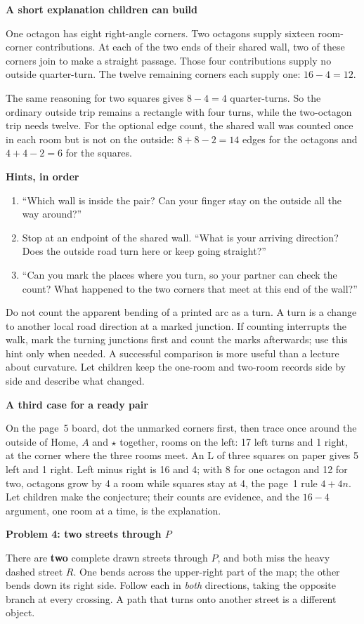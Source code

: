 \documentclass[11pt]{article}
\newcommand{\topic}[1]{\vspace{4pt}{\large\bfseries #1}\par}
\newcommand{\sub}[1]{{\bfseries #1}\par}
\begin{document}
\sub{A short explanation children can build}
One octagon has eight right-angle corners. Two octagons supply sixteen room-corner contributions. At each of the two ends of their shared wall, two of these corners join to make a straight passage. Those four contributions supply no outside quarter-turn. The twelve remaining corners each supply one: \(16-4=12\).

The same reasoning for two squares gives \(8-4=4\) quarter-turns. So the ordinary outside trip remains a rectangle with four turns, while the two-octagon trip needs twelve. For the optional edge count, the shared wall was counted once in each room but is not on the outside: \(8+8-2=14\) edges for the octagons and \(4+4-2=6\) for the squares.

\sub{Hints, in order}
\begin{enumerate}
\item ``Which wall is inside the pair? Can your finger stay on the outside all the way around?''
\item Stop at an endpoint of the shared wall. ``What is your arriving direction? Does the outside road turn here or keep going straight?''
\item ``Can you mark the places where you turn, so your partner can check the count? What happened to the two corners that meet at this end of the wall?''
\end{enumerate}
Do not count the apparent bending of a printed arc as a turn. A turn is a change to another local road direction at a marked junction. If counting interrupts the walk, mark the turning junctions first and count the marks afterwards; use this hint only when needed. A successful comparison is more useful than a lecture about curvature. Let children keep the one-room and two-room records side by side and describe what changed.

\sub{A third case for a ready pair}
On the page~5 board, dot the unmarked corners first, then trace once around the outside of Home, \(A\) and \(\star\) together, rooms on the left: 17 left turns and 1 right, at the corner where the three rooms meet. An L of three squares on paper gives 5 left and 1 right. Left minus right is 16 and 4; with 8 for one octagon and 12 for two, octagons grow by 4 a room while squares stay at 4, the page~1 rule \(4+4n\). Let children make the conjecture; their counts are evidence, and the \(16-4\) argument, one room at a time, is the explanation.
\newpage

\topic{Problems 4--6: whole roads, room routes and growth}
\sub{Problem 4: two streets through \(P\)}
There are \textbf{two} complete drawn streets through \(P\), and both miss the heavy dashed street \(R\). One bends across the upper-right part of the map; the other bends down its right side. Follow each in \emph{both} directions, taking the opposite branch at every crossing. A path that turns onto another street is a different object.
\end{document}
